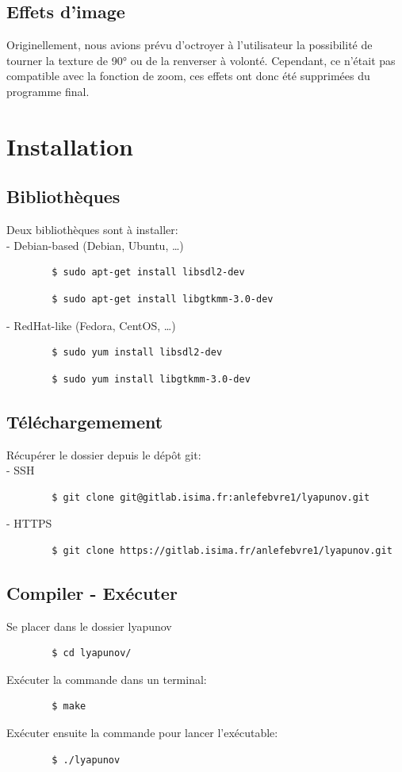 \documentclass{article}
\begin{document}
	\subsection{Effets d'image}

	Originellement, nous avions prévu d'octroyer à l'utilisateur la possibilité de tourner la texture de 90° ou de la renverser à volonté.
	Cependant, ce n'était pas compatible avec la fonction de zoom, ces effets ont donc été supprimées du programme final.

	\section{Installation}
	\subsection{Bibliothèques}
	\noindent Deux bibliothèques sont à installer:\\
	- Debian-based (Debian, Ubuntu, \ldots)
	\begin{lstlisting}
		$ sudo apt-get install libsdl2-dev
	\end{lstlisting}
	\begin{lstlisting}
		$ sudo apt-get install libgtkmm-3.0-dev
	\end{lstlisting}
	- RedHat-like (Fedora, CentOS, \ldots)
	\begin{lstlisting}
		$ sudo yum install libsdl2-dev
	\end{lstlisting}
	\begin{lstlisting}
		$ sudo yum install libgtkmm-3.0-dev
	\end{lstlisting}
	\subsection{Téléchargemement}
	\noindent Récupérer le dossier depuis le dépôt git:\\
	- SSH
	\begin{lstlisting}
		$ git clone git@gitlab.isima.fr:anlefebvre1/lyapunov.git
	\end{lstlisting}
	- HTTPS
	\begin{lstlisting}
		$ git clone https://gitlab.isima.fr/anlefebvre1/lyapunov.git
	\end{lstlisting}
	\subsection{Compiler - Exécuter}
	\noindent Se placer dans le dossier lyapunov
	\begin{lstlisting}
		$ cd lyapunov/
	\end{lstlisting}
	Exécuter la commande dans un terminal: \newline
	\begin{lstlisting}
		$ make
	\end{lstlisting}
	Exécuter ensuite la commande pour lancer l'exécutable:\newline
	\begin{lstlisting}
		$ ./lyapunov
	\end{lstlisting}
\end{document}
